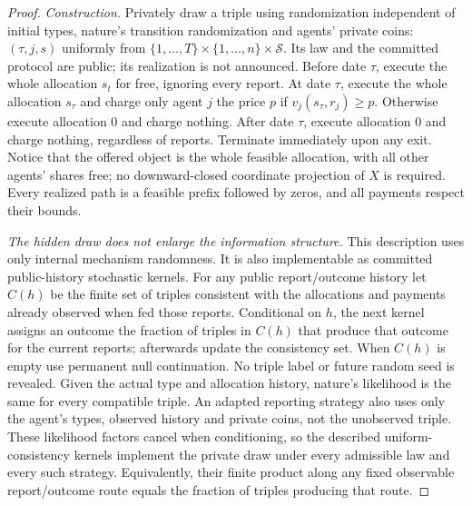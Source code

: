 \documentclass[11pt,a4paper]{article}
\begin{document}
\begin{proof}
\emph{Construction.}
Privately draw a triple using randomization independent of initial types,
nature's transition randomization and agents' private coins:
$(\tau,j,s)$ uniformly from
$\{1,\ldots,T\}\times\{1,\ldots,n\}\times\mathcal S$.
Its law and the committed protocol are public; its realization is not
announced. Before date $\tau$, execute the whole allocation $s_t$ for free,
ignoring every report. At date $\tau$, execute the whole allocation
$s_\tau$ and charge only agent $j$ the price $p$ if
$v_j(s_\tau,r_j)\geq p$. Otherwise execute allocation $0$ and charge
nothing. After date $\tau$, execute allocation $0$ and charge nothing,
regardless of reports. Terminate immediately upon any exit.
Notice that the offered object is the whole feasible allocation, with all
other agents' shares free; no downward-closed coordinate projection of $X$
is required. Every realized path is a feasible prefix followed by zeros,
and all payments respect their bounds.

\emph{The hidden draw does not enlarge the information structure.}
This description uses only internal mechanism randomness. It is also
implementable as committed public-history stochastic kernels. For any
public report/outcome history let $C(h)$ be the finite set of triples
consistent with the allocations and payments already observed when fed
those reports. Conditional on $h$, the next kernel assigns an outcome the
fraction of triples in $C(h)$ that produce that outcome for the current
reports; afterwards update the consistency set. When $C(h)$ is empty use
permanent null continuation. No triple label or future random seed is
revealed. Given the actual type and allocation history, nature's likelihood
is the same for every compatible triple. An adapted reporting strategy
also uses only the agent's types, observed history and private coins, not
the unobserved triple. These likelihood factors cancel when conditioning,
so the described uniform-consistency kernels implement the private draw
under every admissible law and every such strategy. Equivalently, their
finite product along any fixed observable report/outcome route equals the
fraction of triples producing that route.


\end{proof}
\end{document}
